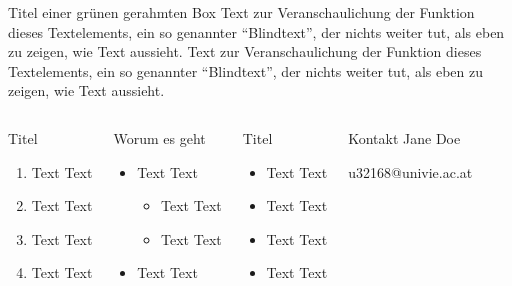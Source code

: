 \documentclass[german,portrait]{univie-ling-poster}
\begin{document}
\begin{frame}
\begin{greenframedbox}{Titel einer grünen gerahmten Box}
	Text zur Veranschaulichung der Funktion dieses Textelements, ein so
	genannter \enquote{Blindtext}, der nichts weiter tut, als eben zu zeigen,
	wie Text aussieht. Text zur Veranschaulichung der Funktion dieses Textelements, ein so
	genannter \enquote{Blindtext}, der nichts weiter tut, als eben zu zeigen,
	wie Text aussieht.
\end{greenframedbox}

\begin{columns}[t, totalwidth=\textwidth]


\begin{redbox}{Titel}
	\begin{enumerate}
	\item Text Text
	\item Text Text
	\item Text Text
	\item Text Text
	\end{enumerate}
\end{redbox}


\begin{bluebox}{Worum es geht}
	\begin{itemize}
	\item Text Text
		\begin{itemize}
		\item Text Text
		\item Text Text
		\end{itemize}
	\item Text Text
	\end{itemize}
\end{bluebox}



\begin{bluebox}{Titel}
	\begin{itemize}
	\item Text Text
	\item Text Text
	\item Text Text
	\item Text Text
	\end{itemize}
\end{bluebox}

\begin{greenbox}{Kontakt}
   Jane Doe

   u32168@univie.ac.at
\end{greenbox}

\end{columns}%

\end{frame}%
\end{document}
